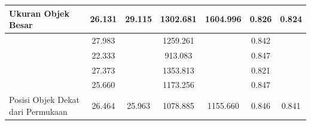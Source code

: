 \begin{table}[]
\begin{tabular}{|l|cc|cc|cc|}
  \multirow{-5}{*}{Ukuran Objek Besar}                & \multicolumn{1}{c|}{\cellcolor[HTML]{FFFFFF}26.131} & \multirow{-5}{*}{\cellcolor[HTML]{FFFFFF}29.115} & \multicolumn{1}{c|}{\cellcolor[HTML]{FFFFFF}1302.681} & \multirow{-5}{*}{\cellcolor[HTML]{FFFFFF}1604.996} & \multicolumn{1}{c|}{\cellcolor[HTML]{FFFFFF}0.826} & \multirow{-5}{*}{\cellcolor[HTML]{FFFFFF}0.824} \\ \hline
                                                      & \multicolumn{1}{c|}{\cellcolor[HTML]{FFFFFF}27.983} & \cellcolor[HTML]{FFFFFF}                         & \multicolumn{1}{c|}{\cellcolor[HTML]{FFFFFF}1259.261} & \cellcolor[HTML]{FFFFFF}                           & \multicolumn{1}{c|}{\cellcolor[HTML]{FFFFFF}0.842} & \cellcolor[HTML]{FFFFFF}                        \\ \cline{2-2} \cline{4-4} \cline{6-6}
                                                      & \multicolumn{1}{c|}{\cellcolor[HTML]{FFFFFF}22.333} & \cellcolor[HTML]{FFFFFF}                         & \multicolumn{1}{c|}{\cellcolor[HTML]{FFFFFF}913.083}  & \cellcolor[HTML]{FFFFFF}                           & \multicolumn{1}{c|}{\cellcolor[HTML]{FFFFFF}0.847} & \cellcolor[HTML]{FFFFFF}                        \\ \cline{2-2} \cline{4-4} \cline{6-6}
                                                      & \multicolumn{1}{c|}{\cellcolor[HTML]{FFFFFF}27.373} & \cellcolor[HTML]{FFFFFF}                         & \multicolumn{1}{c|}{\cellcolor[HTML]{FFFFFF}1353.813} & \cellcolor[HTML]{FFFFFF}                           & \multicolumn{1}{c|}{\cellcolor[HTML]{FFFFFF}0.821} & \cellcolor[HTML]{FFFFFF}                        \\ \cline{2-2} \cline{4-4} \cline{6-6}
                                                      & \multicolumn{1}{c|}{\cellcolor[HTML]{FFFFFF}25.660} & \cellcolor[HTML]{FFFFFF}                         & \multicolumn{1}{c|}{\cellcolor[HTML]{FFFFFF}1173.256} & \cellcolor[HTML]{FFFFFF}                           & \multicolumn{1}{c|}{\cellcolor[HTML]{FFFFFF}0.847} & \cellcolor[HTML]{FFFFFF}                        \\ \cline{2-2} \cline{4-4} \cline{6-6}
  \multirow{-5}{*}{Posisi Objek Dekat dari Permukaan} & \multicolumn{1}{c|}{\cellcolor[HTML]{FFFFFF}26.464} & \multirow{-5}{*}{\cellcolor[HTML]{FFFFFF}25.963} & \multicolumn{1}{c|}{\cellcolor[HTML]{FFFFFF}1078.885} & \multirow{-5}{*}{\cellcolor[HTML]{FFFFFF}1155.660} & \multicolumn{1}{c|}{\cellcolor[HTML]{FFFFFF}0.846} & \multirow{-5}{*}{\cellcolor[HTML]{FFFFFF}0.841} \\ \hline

\end{tabular}
\end{table}
